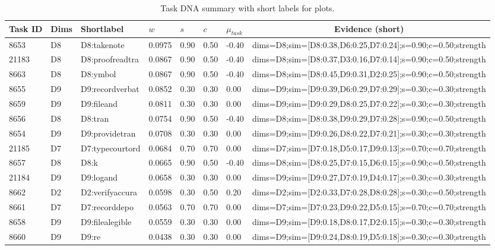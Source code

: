 \begin{table}[htbp]
\centering
\caption{Task DNA summary with short labels for plots.}
\label{tab:appendix_taskdna_shortlabel}
\begin{tabular}{@{}lllllllc@{}}
\toprule
Task ID & Dims & Shortlabel & $w$ & $s$ & $c$ & $\mu_{task}$ & Evidence (short) \\
\midrule
8653 & D8 & D8:takenote & 0.0975 & 0.90 & 0.50 & -0.40 & dims=D8;sim=[D8:0.38,D6:0.25,D7:0.24];s=0.90;c=0.50;strength \\
21183 & D8 & D8:proofreadtra & 0.0867 & 0.90 & 0.50 & -0.40 & dims=D8;sim=[D8:0.37,D3:0.16,D7:0.14];s=0.90;c=0.50;strength \\
8663 & D8 & D8:ymbol & 0.0867 & 0.90 & 0.50 & -0.40 & dims=D8;sim=[D8:0.45,D9:0.31,D2:0.25];s=0.90;c=0.50;strength \\
8655 & D9 & D9:recordverbat & 0.0852 & 0.30 & 0.30 & 0.00 & dims=D9;sim=[D9:0.39,D6:0.29,D7:0.29];s=0.30;c=0.30;strength \\
8659 & D9 & D9:fileand & 0.0811 & 0.30 & 0.30 & 0.00 & dims=D9;sim=[D9:0.29,D8:0.25,D7:0.22];s=0.30;c=0.30;strength \\
8656 & D8 & D8:tran & 0.0754 & 0.90 & 0.50 & -0.40 & dims=D8;sim=[D8:0.38,D9:0.29,D7:0.28];s=0.90;c=0.50;strength \\
8654 & D9 & D9:providetran & 0.0708 & 0.30 & 0.30 & 0.00 & dims=D9;sim=[D9:0.26,D8:0.22,D7:0.21];s=0.30;c=0.30;strength \\
21185 & D7 & D7:typecourtord & 0.0684 & 0.70 & 0.70 & 0.00 & dims=D7;sim=[D7:0.18,D5:0.17,D9:0.13];s=0.70;c=0.70;strength \\
8657 & D8 & D8:k & 0.0665 & 0.90 & 0.50 & -0.40 & dims=D8;sim=[D8:0.25,D7:0.15,D6:0.15];s=0.90;c=0.50;strength \\
21184 & D9 & D9:logand & 0.0658 & 0.30 & 0.30 & 0.00 & dims=D9;sim=[D9:0.27,D7:0.19,D4:0.17];s=0.30;c=0.30;strength \\
8662 & D2 & D2:verifyaccura & 0.0598 & 0.30 & 0.50 & 0.20 & dims=D2;sim=[D2:0.33,D7:0.28,D8:0.28];s=0.30;c=0.50;strength \\
8661 & D7 & D7:recorddepo & 0.0563 & 0.70 & 0.70 & 0.00 & dims=D7;sim=[D7:0.23,D9:0.22,D5:0.15];s=0.70;c=0.70;strength \\
8658 & D9 & D9:filealegible & 0.0559 & 0.30 & 0.30 & 0.00 & dims=D9;sim=[D9:0.18,D8:0.17,D2:0.15];s=0.30;c=0.30;strength \\
8660 & D9 & D9:re & 0.0438 & 0.30 & 0.30 & 0.00 & dims=D9;sim=[D9:0.24,D8:0.19,D5:0.18];s=0.30;c=0.30;strength \\
\bottomrule
\end{tabular}
\end{table}